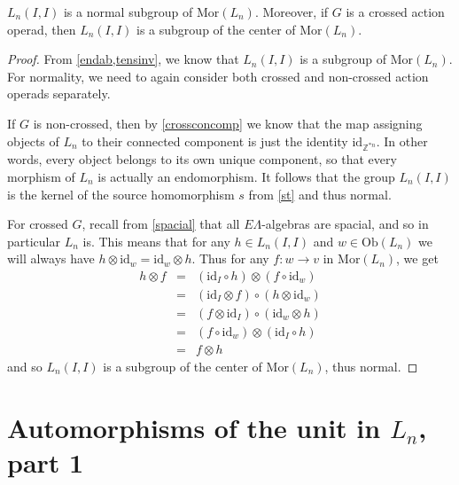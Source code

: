 \documentclass{amsbook} %
\numberwithin{section}{chapter}
\begin{document}
\begin{prop} \label{endnorm} $L_n(I,I)$ is a normal subgroup of $\mathrm{Mor}(L_n)$. Moreover, if $G$ is a crossed action operad, then $L_n(I,I)$ is a subgroup of the center of $\mathrm{Mor}(L_n)$.
\end{prop}
\begin{proof}
From \cref{endab,tensinv}, we know that $L_n(I,I)$ is a subgroup of $\mathrm{Mor}(L_n)$. For normality, we need to again consider both crossed and non-crossed action operads separately. 

If $G$ is non-crossed, then by \cref{crossconcomp} we know that the map assigning objects of $L_n$ to their connected component is just the identity $\mathrm{id}_{\mathbb{Z}^{\ast n}}$. In other words, every object belongs to its own unique component, so that every morphism of $L_n$ is actually an endomorphism. It follows that the group $L_n(I,I)$ is the kernel of the source homomorphism $s$ from \cref{st} and thus normal.

For crossed $G$, recall from \cref{spacial} that all $E\Lambda$-algebras are spacial, and so in particular $L_n$ is. This means that for any $h \in L_n(I,I)$ and $w \in \mathrm{Ob}(L_n)$ we will always have $h \otimes \mathrm{id}_w = \mathrm{id}_w \otimes h$. Thus for any $f:w \to v$ in $\mathrm{Mor}(L_n)$, we get
\[ \begin{array}{rll}
		h \otimes f & = & (\mathrm{id}_I \circ h) \otimes (f \circ \mathrm{id}_w) \\
		& = & (\mathrm{id}_I \otimes f) \circ (h \otimes \mathrm{id}_w) \\
		& = & (f \otimes \mathrm{id}_I) \circ (\mathrm{id}_w \otimes h) \\
		& = & (f \circ \mathrm{id}_w) \otimes (\mathrm{id}_I \circ h) \\
		& = & f \otimes h
		\end{array}
\]
and so $L_n(I,I)$ is a subgroup of the center of $\mathrm{Mor}(L_n)$, thus normal. 
\end{proof}

\section{Automorphisms of the unit in \texorpdfstring{$L_n$}{L_n}, part 1}
\end{document}
